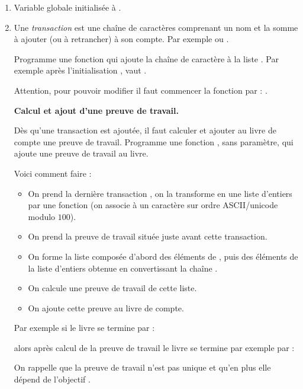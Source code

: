 \documentclass[12pt,class=report,crop=false]{standalone}
\begin{document}
  \begin{enumerate}
    \item Variable globale  initialisée à  .
  
    \item Une \emph{transaction} est une chaîne de caractères comprenant un nom et la somme à ajouter (ou à retrancher) à son compte. Par exemple  ou .
    
    Programme une fonction  qui ajoute la chaîne de caractère  à la liste . 
Par exemple après l'initialisation ,  
     vaut \ci{[ [0, 0, 0, 0, 0, 0], "Camille +100" ]}.
    
    
    Attention, pour pouvoir modifier  il faut commencer la fonction par : .
 
\newpage

 \textbf{Calcul et ajout d'une preuve de travail.}  

Dès qu'une transaction est ajoutée, il faut calculer et ajouter au livre de compte une preuve de travail. Programme une fonction , sans paramètre, qui ajoute une preuve de travail au livre.   
   
Voici comment faire :
  \begin{itemize}
    \item On prend la dernière transaction , on la transforme en une liste d'entiers par une fonction  (on associe à un caractère sur ordre ASCII/unicode modulo $100$).
    \item On prend la preuve de travail  située juste avant cette transaction.
    \item On forme la liste  composée d'abord des éléments de , puis des éléments de la liste d'entiers obtenue en convertissant la chaîne .
    \item On calcule une preuve de travail de cette liste.
    \item  On ajoute cette preuve au livre de compte.
  \end{itemize}
  Par exemple si le livre se termine par :\\
  \centerline{}
  alors après calcul de la preuve de travail le livre se termine par exemple par :\\
  \centerline{}  
     On rappelle que la preuve de travail n'est pas unique et qu'en plus elle dépend 
   de l'objectif .
   

\end{enumerate}
\end{document}
